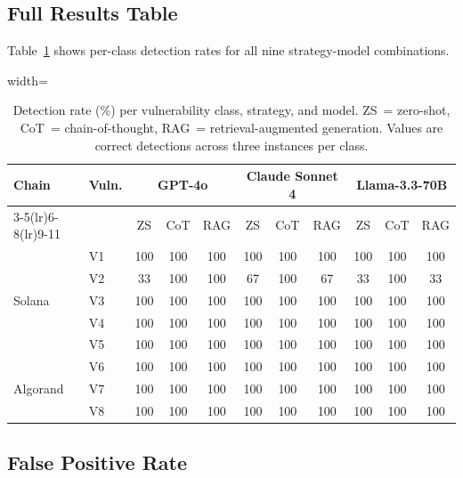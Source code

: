 \documentclass[runningheads]{llncs}
\begin{document}
\subsection{Full Results Table}

Table~\ref{tab:main_results} shows per-class detection rates for all nine
strategy-model combinations.

\begin{table}[t]
\caption{Detection rate (\%) per vulnerability class, strategy, and model.
ZS~= zero-shot, CoT~= chain-of-thought, RAG~= retrieval-augmented generation.
Values are correct detections across three instances per class.}
\label{tab:main_results}
\centering
\begin{adjustbox}{width=\textwidth}
\begin{tabular}{llccccccccc}
\toprule
\multirow{2}{*}{\textbf{Chain}} & \multirow{2}{*}{\textbf{Vuln.}} &
\multicolumn{3}{c}{\textbf{GPT-4o}} &
\multicolumn{3}{c}{\textbf{Claude Sonnet 4}} &
\multicolumn{3}{c}{\textbf{Llama-3.3-70B}} \\
\cmidrule(lr){3-5}\cmidrule(lr){6-8}\cmidrule(lr){9-11}
& & ZS & CoT & RAG & ZS & CoT & RAG & ZS & CoT & RAG \\
\midrule
\multirow{5}{*}{Solana}
  & V1 & 100 & 100 & 100 & 100 & 100 & 100 & 100 & 100 & 100 \\
  & V2 &  33 & 100 & 100 &  67 & 100 &  67 &  33 & 100 &  33 \\
  & V3 & 100 & 100 & 100 & 100 & 100 & 100 & 100 & 100 & 100 \\
  & V4 & 100 & 100 & 100 & 100 & 100 & 100 & 100 & 100 & 100 \\
  & V5 & 100 & 100 & 100 & 100 & 100 & 100 & 100 & 100 & 100 \\
\midrule
\multirow{3}{*}{Algorand}
  & V6 & 100 & 100 & 100 & 100 & 100 & 100 & 100 & 100 & 100 \\
  & V7 & 100 & 100 & 100 & 100 & 100 & 100 & 100 & 100 & 100 \\
  & V8 & 100 & 100 & 100 & 100 & 100 & 100 & 100 & 100 & 100 \\
\bottomrule
\end{tabular}
\end{adjustbox}
\end{table}

\subsection{False Positive Rate}
\label{subsec:fpr}
\end{document}
